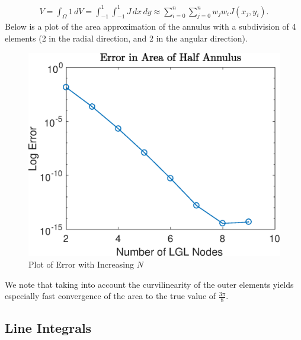 \documentclass{article}
\begin{document}
  \begin{align*}
    V =  \int_\Omega 1 \, dV = \int_{-1}^1 \int_{-1}^1 J \, dx\,dy \approx \sum_{i = 0}^n \sum_{j=0}^n w_j w_i J(x_j, y_i).
  \end{align*}
  Below is a plot of the area approximation of the annulus with a subdivision of 4 elements (2 in the radial direction, and 2 in the angular direction).
  \begin{figure}[H]
    \centering
    \includegraphics[scale=0.7]{media/GHannulus.eps}
    \caption{Plot of Error with Increasing $N$}
    \label{fig:annulus_plot}
  \end{figure}
\noindent We note that taking into account the curvilinearity of the outer elements yields especially fast convergence of the area to the true value of $\frac{3\pi}{8}$.

\subsection{Line Integrals}

\end{document}
